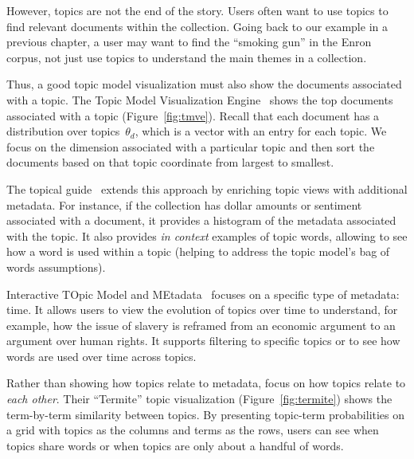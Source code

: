 However, topics are not the end of the story.  Users often want to use topics to
find relevant documents within the collection.  Going back to our
example in a
previous chapter, a user may want to find the ``smoking gun'' in the Enron
corpus, not just use topics to understand the main themes in a collection.

Thus, a good topic model visualization must also show the documents associated
with a topic.  The Topic Model Visualization Engine~\citep[]{chaney-12} shows the
top documents associated with a topic (Figure~\ref{fig:tmve}).  Recall that each
document has a distribution over topics~$\theta_d$, which is a vector with an
entry for each topic.  We focus on the dimension associated with a particular topic
and then sort the documents based on that topic coordinate from largest to
smallest.

The topical guide~\citep{gardner-10} extends this approach by enriching topic
views with additional metadata.  For instance, if the collection has dollar
amounts or sentiment~\citep{pang-08} associated with a document, it provides a
histogram of the metadata associated with the topic.  It also provides \emph{in
  context} examples of topic words, allowing to see how a word is used within a
topic (helping to address the topic model's bag of words assumptions).

Interactive TOpic Model and MEtadata~\citep[Interactive TOpic Model and MEtadata]{eistenstein-14} focuses on a specific type of metadata: time.
It allows users to view the evolution of topics over time to understand, for
example, how the issue of slavery is reframed from an economic argument to an
argument over human rights.  It supports filtering to specific topics or to see
how words are used over time across topics.

Rather than showing how topics relate to metadata,
\citet{chuang-12} focus on how topics relate to \emph{each other}.
Their ``Termite'' topic visualization (Figure~\ref{fig:termite}) shows
the term-by-term similarity between topics.  By presenting topic-term
probabilities on a grid with topics as the columns and terms as the
rows, users can see when topics share words or when topics are only
about a handful of words.

